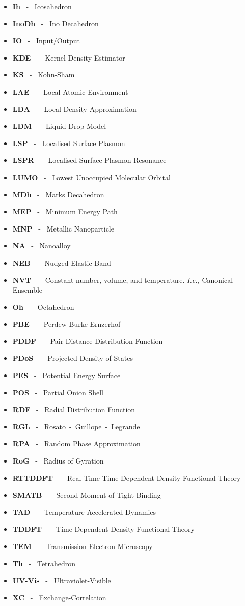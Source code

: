 \begin{itemize}
\item[]\textbf{Ih} ~-~ Icosahedron
\item[]\textbf{InoDh} ~-~ Ino Decahedron
\item[]\textbf{IO} ~-~ Input/Output
\item[]\textbf{KDE} ~-~ Kernel Density Estimator
\item[]\textbf{KS} ~-~ Kohn-Sham
\item[]\textbf{LAE} ~-~ Local Atomic Environment
\item[]\textbf{LDA} ~-~ Local Density Approximation
\item[]\textbf{LDM} ~-~ Liquid Drop Model
\item[]\textbf{LSP} ~-~ Localised Surface Plasmon
\item[]\textbf{LSPR} ~-~ Localised Surface Plasmon Resonance
\item[]\textbf{LUMO} ~-~ Lowest Unoccupied Molecular Orbital
\item[]\textbf{MDh} ~-~ Marks Decahedron
\item[]\textbf{MEP} ~-~ Minimum Energy Path
\item[]\textbf{MNP} ~-~ Metallic Nanoparticle
\item[]\textbf{NA} ~-~ Nanoalloy
\item[]\textbf{NEB} ~-~ Nudged Elastic Band
\item[]\textbf{NVT} ~-~ Constant number, volume, and temperature. \textit{I.e.,} Canonical Ensemble
\item[]\textbf{Oh} ~-~ Octahedron
\item[]\textbf{PBE} ~-~ Perdew-Burke-Ernzerhof
\item[]\textbf{PDDF} ~-~ Pair Distance Distribution Function
\item[]\textbf{PDoS} ~-~ Projected Density of States
\item[]\textbf{PES} ~-~ Potential Energy Surface
\item[]\textbf{POS} ~-~ Partial Onion Shell
\item[]\textbf{RDF} ~-~ Radial Distribution Function
\item[]\textbf{RGL} ~-~ Rosato~-~Guillope~-~Legrande
\item[]\textbf{RPA} ~-~ Random Phase Approximation
\item[]\textbf{RoG} ~-~ Radius of Gyration
\item[]\textbf{RTTDDFT} ~-~ Real Time Time Dependent Density Functional Theory
\item[]\textbf{SMATB} ~-~ Second Moment of Tight Binding
\item[]\textbf{TAD} ~-~ Temperature Accelerated Dynamics
\item[]\textbf{TDDFT} ~-~ Time Dependent Density Functional Theory
\item[]\textbf{TEM} ~-~ Transmission Electron Microscopy
\item[]\textbf{Th} ~-~ Tetrahedron
\item[]\textbf{UV-Vis} ~-~ Ultraviolet-Visible
\item[]\textbf{XC} ~-~ Exchange-Correlation
\end{itemize}